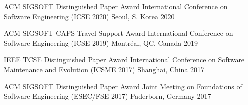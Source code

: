 
\begin{cvhonors}

  \cvhonor
    {ACM SIGSOFT Distinguished Paper Award} %
    {International Conference on Software Engineering ({ICSE} 2020)} %
    {Seoul, S. Korea} %
    {2020} %

  \cvhonor
    {ACM SIGSOFT CAPS Travel Support Award} %
    {International Conference on Software Engineering (ICSE 2019)} %
    {Montréal, QC, Canada} %
    {2019} %

  \cvhonor
    {IEEE TCSE Distinguished Paper Award} %
    {International Conference on Software Maintenance and Evolution ({ICSME} 2017)} %
    {Shanghai, China} %
    {2017} %

  \cvhonor
    {ACM SIGSOFT Distinguished Paper Award} %
    {Joint Meeting on Foundations of Software Engineering ({ESEC/FSE} 2017)} %
    {Paderborn, Germany} %
    {2017} %

\end{cvhonors}
